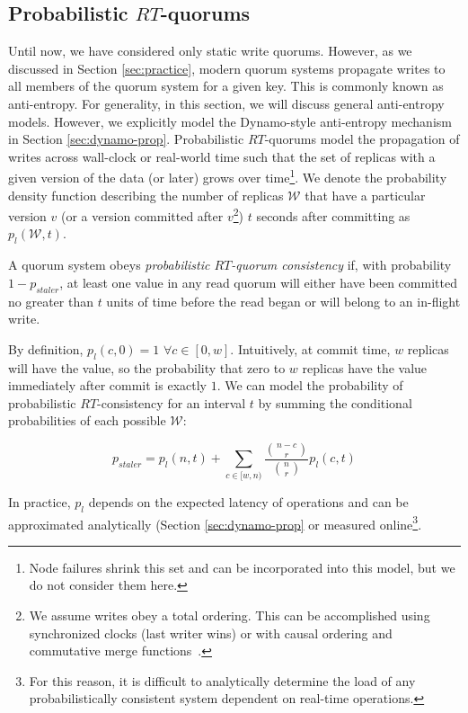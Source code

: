 \documentclass{vldb}
\begin{document}
\subsection{Probabilistic $RT$-quorums}

Until now, we have considered only static write quorums.  However, as
we discussed in Section \ref{sec:practice}, modern quorum systems
propagate writes to all members of the quorum system for a given key.
This is commonly known as anti-entropy.  For generality, in this
section, we will discuss general anti-entropy models. However, we
explicitly model the Dynamo-style anti-entropy mechanism in Section
\ref{sec:dynamo-prop}.  Probabilistic $RT$-quorums model the
propagation of writes across wall-clock or real-world time such that
the set of replicas with a given version of the data (or later) grows
over time\footnote{Node failures shrink this set and can be
  incorporated into this model, but we do not consider them here.}.
We denote the probability density function describing the number of
replicas $\mathcal{W}$ that have a particular version $v$ (or a
version committed after $v$\footnote{We assume writes obey a total
  ordering. This can be accomplished using synchronized clocks (last
  writer wins) or with causal ordering and commutative merge
  functions~\cite{cops}.}) $t$ seconds after committing as
$p_l(\mathcal{W}, t)$.

\begin{definition}
A quorum system obeys \textit{probabilistic $RT$-quorum consistency}
if, with probability $1-p_{staler}$, at least one value in any read
quorum will either have been committed no greater than $t$ units of
time before the read began or will belong to an in-flight write.
\end{definition}

By definition, $p_l(c,0) = 1$ $\forall c \in [0, w]$.  Intuitively, at
commit time, $w$ replicas will have the value, so the probability that
zero to $w$ replicas have the value immediately after commit is
exactly $1$.  We can model the probability of probabilistic $RT$-consistency for an interval $t$ by summing the conditional probabilities of each possible $\mathcal{W}$:

\begin{equation}
p_{staler} = p_l(n, t)+\sum_{c\in[w, n)} \frac{{n-c \choose r}}{{n \choose r}} p_l(c, t)
\end{equation}

In practice, $p_l$ depends on the expected latency of operations and can be
approximated analytically (Section \ref{sec:dynamo-prop} or measured
online\footnote{For this reason, it is difficult to analytically
  determine the load of any probabilistically consistent system
  dependent on real-time operations.}.
\end{document}
